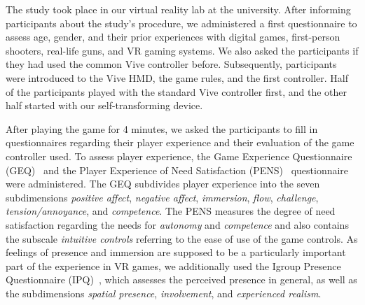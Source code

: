 \documentclass{sigchi}
\begin{document}
The study took place in our virtual reality lab at the university. After informing participants about the study's procedure, we administered a first questionnaire to assess age, gender, and their prior experiences with digital games, first-person shooters, real-life guns, and VR gaming systems. We also asked the participants if they had used the common Vive controller before. Subsequently, participants were introduced to the Vive HMD, the game rules, and the first controller. Half of the participants played with the standard Vive controller first, and the other half started with our self-transforming device. 

After playing the game for 4 minutes, we asked the participants to fill in questionnaires regarding their player experience and their evaluation of the game controller used. To assess player experience, the Game Experience Questionnaire (GEQ)~\cite{ijsselsteijn2008measuring} and the Player Experience of Need Satisfaction (PENS)~\cite{Ryan.2006} questionnaire were administered. The GEQ subdivides player experience into the seven subdimensions \textit{positive affect}, \textit{negative affect}, \textit{immersion}, \textit{flow}, \textit{challenge}, \textit{tension/annoyance}, and \textit{competence}. The PENS measures the degree of need satisfaction regarding the needs for \textit{autonomy} and \textit{competence} and also contains the subscale \textit{intuitive controls} referring to the ease of use of the game controls. 
As feelings of presence and immersion are supposed to be a particularly important part of the experience in VR games, we additionally used the Igroup Presence Questionnaire (IPQ)~\cite{Schubert.1999b}, which assesses the perceived presence in general, as well as the subdimensions \textit{spatial presence}, \textit{involvement}, and \textit{experienced realism}.
\end{document}
